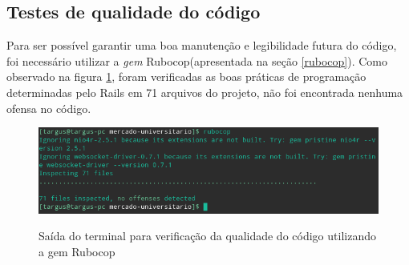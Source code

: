 \subsection{Testes de qualidade do código}
Para ser possível garantir uma boa manutenção e legibilidade futura do código, foi necessário utilizar a \textit{gem} Rubocop(apresentada na seção \ref{rubocop}). Como observado na figura \ref{fig:rubocop}, foram verificadas as boas práticas de programação determinadas pelo Rails em 71 arquivos do projeto, não foi encontrada nenhuma ofensa no código.
\begin{figure}[htbp!]
  \centering
  \caption{Saída do terminal para verificação da qualidade do código utilizando a gem Rubocop}
  \includegraphics[width=1\textwidth]{figs/rubocop.png}
    \label{fig:rubocop}
\end{figure}
